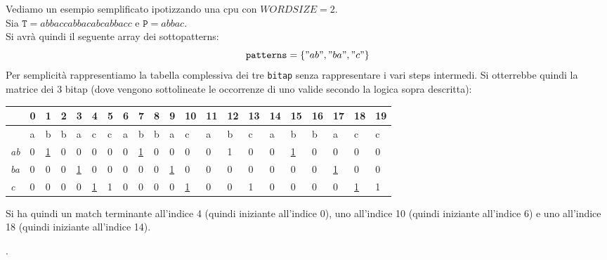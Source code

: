 \documentclass[a4paper,12pt, oneside]{article}
\begin{document}
\begin{esempio}
  Vediamo un esempio semplificato ipotizzando una cpu con
  $WORDSIZE=2$.\\
  Sia $\mathtt{T}=abbaccabbacabcabbacc$ e $\mathtt{P}=abbac$.\\
  Si avrà quindi il seguente array dei sottopatterns:
  \[\mathtt{patterns}=\{"ab", "ba", "c"\}\]
  Per semplicità rappresentiamo la tabella complessiva dei tre
  \texttt{bitap} senza rappresentare i vari steps intermedi. Si
  otterrebbe quindi la matrice dei 3 bitap (dove vengono sottolineate
  le occorrenze di uno valide secondo la logica sopra descritta):
  \begin{center}
    \begin{table}[H]
      \begin{tabular}{l|l|l|l|l|l|l|l|l|l|l|l|l|l|l|l|l|l|l|l|l|}
        \toprule
        & 0 & 1 & 2 & 3 & 4 & 5 & 6 & 7 & 8 & 9 & 10 & 11 & 12 & 13 &
                                                                      14
        & 15 & 16 & 17 & 18 & 19 \\ \hline
        & a & b & b & a & c & c & a & b & b & a & c & a & b & c & a &
                                                                      b
             & b & a & c & c \\ \hline\hline  
        \textit{ab} & 0 & \underline{1} & 0 & 0 & 0 & 0 & 0 &
                                                              \underline{1}
                                        & 0
                                            & 
                                                                      0
                                                & 0 & 0 & 1 & 0 & 0 &
                                                                  \underline{1} 
             & 0 & 0 & 0 & 0 \\ \hline   
        \textit{ba} & 0 & 0 & 0 & \underline{1} & 0 & 0 & 0 & 0 & 0 &
                                                                    \underline{1}
                                                                      
                                                & 0 & 0 & 0 & 0 & 0 &
                                                                      0
             & 0 & \underline{1} & 0 & 0 \\ \hline   
        \textit{c} & 0 & 0 & 0 & 0 & \underline{1} & 1 & 0 & 0 & 0 & 0
                                                & \underline{1} & 0 &
                                                                      0 & 1 & 0 & 
                                                                      0
             & 0 & 0 & \underline{1} & 1 \\ \bottomrule   
      \end{tabular}
    \end{table}
  \end{center}
  Si ha quindi un match terminante all'indice 4 (quindi iniziante all'indice
  0), uno all'indice 10 (quindi iniziante all'indice 6)
  e uno all'indice 18 (quindi iniziante all'indice 14).
\end{esempio}.
\end{document}
